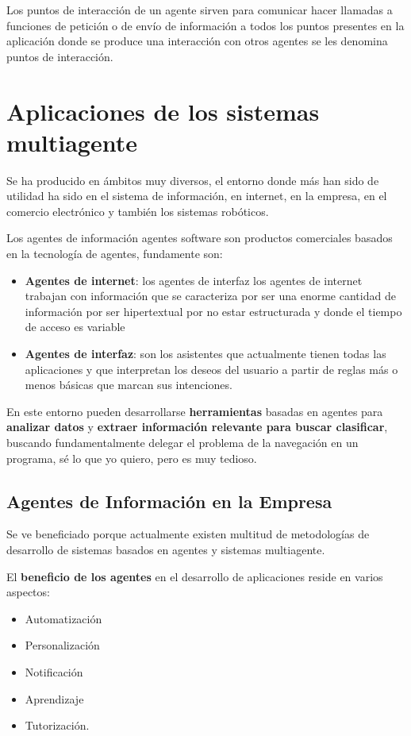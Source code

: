 \documentclass[12pt, twoside, openright]{report} %
\begin{document}
Los puntos de interacción de un agente sirven para comunicar hacer llamadas a funciones de petición o de envío de información a todos los puntos presentes en la aplicación donde se produce una interacción con otros agentes se les denomina puntos de interacción.

\section{Aplicaciones de los sistemas multiagente} 
Se ha producido en ámbitos muy diversos, el entorno donde más han sido de utilidad ha sido en el sistema de información, en internet, en la empresa, en el comercio electrónico y también los sistemas robóticos.

Los agentes de información agentes software son productos comerciales basados en la tecnología de agentes, fundamente son:
\begin{itemize}
	\item \textbf{Agentes de internet}: los agentes de interfaz  los agentes de internet trabajan con información que se caracteriza por ser una enorme cantidad de información por ser hipertextual por no estar estructurada y donde el tiempo de acceso es variable
	\item \textbf{Agentes de interfaz}: son los asistentes que actualmente tienen todas las aplicaciones y que interpretan los deseos del usuario a partir de reglas más o menos básicas que marcan sus intenciones.
\end{itemize}
\pagebreak

En este entorno pueden desarrollarse \textbf{herramientas} basadas en agentes para \textbf{analizar datos} y \textbf{extraer información relevante para buscar clasificar}, buscando fundamentalmente delegar el problema de la navegación en un programa, sé lo que yo quiero, pero es muy tedioso.

\subsection{Agentes de Información en la Empresa}
Se ve beneficiado porque actualmente existen multitud de metodologías de desarrollo de sistemas basados en agentes y sistemas multiagente.

El  \textbf{beneficio de los agentes} en el desarrollo de aplicaciones reside en varios aspectos:
\begin{itemize}
	\item Automatización
	\item Personalización
	\item Notificación
	\item Aprendizaje 
	\item Tutorización. 
\end{itemize} 
\end{document}
